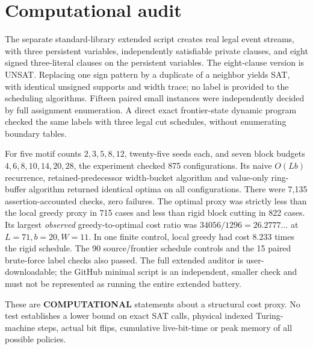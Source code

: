\documentclass[11pt]{article}
\begin{document}
\section{Computational audit}
The separate standard-library extended script creates real legal event streams, with three persistent variables, independently satisfiable private clauses, and eight signed three-literal clauses on the persistent variables. The eight-clause version is UNSAT. Replacing one sign pattern by a duplicate of a neighbor yields SAT, with identical unsigned supports and width trace; no label is provided to the scheduling algorithms. Fifteen paired small instances were independently decided by full assignment enumeration. A direct exact frontier-state dynamic program checked the same labels with three legal cut schedules, without enumerating boundary tables.

For five motif counts $2,3,5,8,12$, twenty-five seeds each, and seven block budgets $4,6,8,10,14,20,28$, the experiment checked 875 configurations. Its naive $O(Lb)$ recurrence, retained-predecessor width-bucket algorithm and value-only ring-buffer algorithm returned identical optima on all configurations. There were 7,135 assertion-accounted checks, zero failures. The optimal proxy was strictly less than the local greedy proxy in 715 cases and less than rigid block cutting in 822 cases. Its largest \emph{observed} greedy-to-optimal cost ratio was $34056/1296=26.2777\ldots$ at $L=71,b=20,W=11$. In one finite control, local greedy had cost $8.233$ times the rigid schedule. The 90 source/frontier schedule controls and the 15 paired brute-force label checks also passed. The full extended auditor is user-downloadable; the GitHub minimal script is an independent, smaller check and must not be represented as running the entire extended battery.

These are \textbf{COMPUTATIONAL} statements about a structural cost proxy. No test establishes a lower bound on exact SAT calls, physical indexed Turing-machine steps, actual bit flips, cumulative live-bit-time or peak memory of all possible policies.
\end{document}
